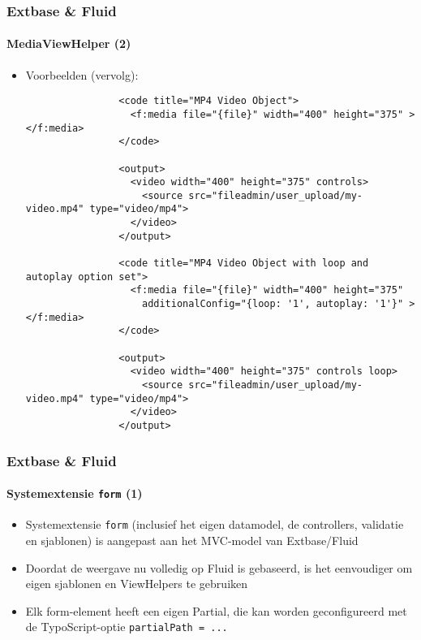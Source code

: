 \begin{frame}[fragile]
	\frametitle{Extbase \& Fluid}
	\framesubtitle{MediaViewHelper (2)}

	\lstset{basicstyle=\tiny\ttfamily}

	\begin{itemize}

		\item Voorbeelden (vervolg):

			\begin{lstlisting}
				<code title="MP4 Video Object">
				  <f:media file="{file}" width="400" height="375" ></f:media>
				</code>

				<output>
				  <video width="400" height="375" controls>
				    <source src="fileadmin/user_upload/my-video.mp4" type="video/mp4">
				  </video>
				</output>

				<code title="MP4 Video Object with loop and autoplay option set">
				  <f:media file="{file}" width="400" height="375"
				    additionalConfig="{loop: '1', autoplay: '1'}" ></f:media>
				</code>

				<output>
				  <video width="400" height="375" controls loop>
				    <source src="fileadmin/user_upload/my-video.mp4" type="video/mp4">
				  </video>
				</output>
			\end{lstlisting}

	\end{itemize}

\end{frame}


\begin{frame}[fragile]
	\frametitle{Extbase \& Fluid}
	\framesubtitle{Systemextensie \texttt{form} (1)}

	\begin{itemize}

		\item Systemextensie \texttt{form} (inclusief het eigen datamodel, de controllers, validatie 
			en sjablonen) is aangepast aan het MVC-model van Extbase/Fluid

		\item Doordat de weergave nu volledig op Fluid is gebaseerd, is het eenvoudiger 
			om eigen sjablonen en ViewHelpers te gebruiken

		\item Elk form-element heeft een eigen Partial, die kan worden geconfigureerd met de 
			TypoScript-optie \texttt{partialPath = ...}

	\end{itemize}

\end{frame}

